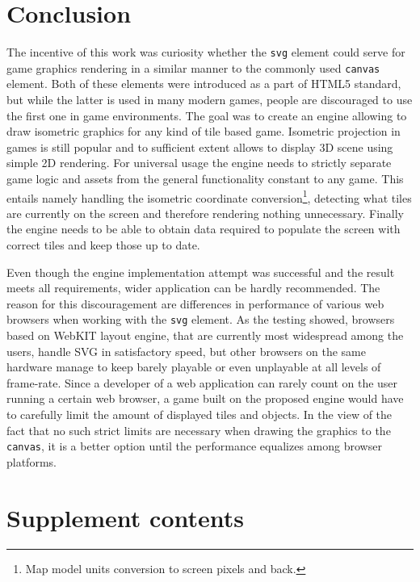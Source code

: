\documentclass[11pt,oneside, final]{fithesis2}
\begin{document}
\chapter{Conclusion}
The incentive of this work was curiosity whether the \texttt{svg} element could serve for game graphics rendering in a similar manner to the commonly used \texttt{canvas} element. Both of these elements were introduced as a part of HTML5 standard, but while the latter is used in many modern games, people are discouraged to use the first one in game environments. The goal was to create an engine allowing to draw isometric graphics for any kind of tile based game. Isometric projection in games is still popular and to sufficient extent allows to display 3D scene using simple 2D rendering. For universal usage the engine needs to strictly separate game logic and assets from the general functionality constant to any game. This entails namely handling the isometric coordinate conversion\footnote{Map model units conversion to screen pixels and back.}, detecting what tiles are currently on the screen and therefore rendering nothing unnecessary. Finally the engine needs to be able to obtain data required to populate the screen with correct tiles and keep those up to date.

Even though the engine implementation attempt was successful and the result meets all requirements, wider application can be hardly recommended. The reason for this discouragement are differences in performance of various web browsers when working with the \texttt{svg} element. As the testing showed, browsers based on WebKIT layout engine, that are currently most widespread among the users, handle SVG in satisfactory speed, but other browsers on the same hardware manage to keep barely playable or even unplayable at all levels of frame-rate. Since a developer of a web application can rarely count on the user running a certain web browser, a game built on the proposed engine would have to carefully limit the amount of displayed tiles and objects. In the view of the fact that no such strict limits are necessary when drawing the graphics to the \texttt{canvas}, it is a better option until the performance equalizes among browser platforms.


\appendix
\chapter{Supplement contents}
\end{document}
